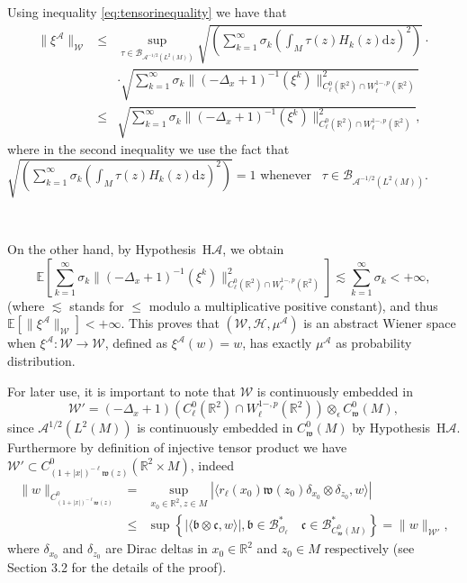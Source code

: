 \documentclass[a4paper,10pt]{article}
\newcommand{\asterisk}{\mathord{*}}
\newcommand{\mathd}{\mathrm{d}}
\begin{document}
Using inequality {\eqref{eq:tensorinequality}} we have that
\begin{eqnarray}
  \| \xi^{\mathcal{A}} \|_{\mathcal{W}} & \leqslant & \sup_{\tau \in
  \mathcal{B}_{\mathcal{A}^{- 1 / 2} (L^2 (M))}} \sqrt{\left( \sum_{k =
  1}^{\infty} \sigma_k \left( \int_M \tau (z) H_k (z) \mathd z \right)^2
  \right)} \cdot \nonumber\\
  &  & \cdot \sqrt{\sum^{\infty}_{k = 1} \sigma_k \| (- \Delta_x + 1)^{- 1}
  (\xi^k) \|^2_{C^0_{\ell} (\mathbb{R}^2) \cap W^{1 -, p}_{\ell}
  (\mathbb{R}^2)}} \nonumber\\
  & \leq & \sqrt{\sum^{\infty}_{k = 1} \sigma_k \| (- \Delta_x + 1)^{- 1}
  (\xi^k) \|^2_{C^0_{\ell} (\mathbb{R}^2) \cap W^{1 -, p}_{\ell}
  (\mathbb{R}^2)}}, 
\end{eqnarray}
where in the second inequality we use the fact that $\sqrt{\left( \sum_{k =
1}^{\infty} \sigma_k \left( \int_M \tau (z) H_k (z) \mathd z \right)^2
\right)} = 1$ whenever \ $\tau \in \mathcal{B}_{\mathcal{A}^{- 1 / 2} (L^2
(M))}$.

\

On the other hand, by Hypothesis~H$\mathcal{A}$, we obtain
\[ \mathbb{E} \left[ \sum^{\infty}_{k = 1} \sigma_k \| (- \Delta_x + 1)^{- 1}
   (\xi^k) \|^2_{C^0_{\ell} (\mathbb{R}^2) \cap W^{1 -, p}_{\ell}
   (\mathbb{R}^2)} \right] \lesssim \sum_{k = 1}^{\infty} \sigma_k < + \infty,
\]
(where $\lesssim$ stands for $\leqslant$ modulo a multiplicative positive
constant), and thus $\mathbb{E} [\| \xi^{\mathcal{A}} \|_{\mathcal{W}}] < +
\infty$. This proves that $(\mathcal{W}, \mathcal{H}, \mu^{\mathcal{A}})$ is
an abstract Wiener space when $\xi^{\mathcal{A}} : \mathcal{W} \rightarrow
\mathcal{W}$, defined as $\xi^{\mathcal{A}} (w) = w$, has exactly
$\mu^{\mathcal{A}}$ as probability distribution.

For later use, it is important to note that $\mathcal{W}$ is continuously
embedded in
\[ \mathcal{W}' = (- \Delta_x + 1) (C^0_{\ell} (\mathbb{R}^2) \cap W^{1 -,
   p}_{\ell} (\mathbb{R}^2)) \otimes_{\epsilon} C^0_{\mathfrak{w}} (M), \]
since $\mathcal{A}^{1 / 2} (L^2 (M))$ is continuously embedded in
$C^0_{\mathfrak{w}} (M)$ by Hypothesis~H$\mathcal{A}$. Furthermore by
definition of injective tensor product we have $\mathcal{W}' \subset C^0_{(1 +
| x |)^{- \ell} \mathfrak{w} (z)} (\mathbb{R}^2 \times M)$, indeed
\begin{eqnarray}
  \| w \|_{C^0_{(1 + | x |)^{- \ell} \mathfrak{w} (z)}} & = & \sup_{x_0 \in
  \mathbb{R}^2, z \in M} | \langle r_{\ell} (x_0) \mathfrak{w} (z_0)
  \delta_{x_0} \otimes \delta_{z_0}, w \rangle | \nonumber\\
  & \leqslant & \sup \left\{ | \langle \mathfrak{b} \otimes \mathfrak{c}, w
  \rangle |, \mathfrak{b} \in \mathcal{B}_{\mathcal{O}_{\ell}}^{\asterisk}
  \quad \mathfrak{c} \in \mathcal{B}_{C^0_{\mathfrak{w}} (M)}^{\asterisk}
  \right\} = \| w \|_{\mathcal{W}'}, \nonumber
\end{eqnarray}
where $\delta_{x_0}$ and $\delta_{z_0}$ are Dirac deltas in $x_0 \in
\mathbb{R}^2$ and $z_0 \in M$ respectively (see~{\cite{Ryan2002}} Section 3.2
for the details of the proof).\\
\end{document}
